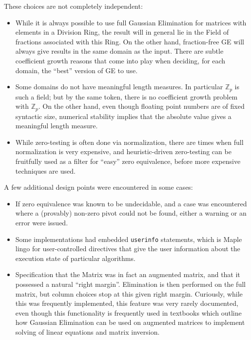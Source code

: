 \documentclass[11pt]{elsart}
\begin{document}
\noindent These choices are not completely independent:  
\begin{itemize}
	\item While it is always possible to use full Gaussian Elimination for
		matrices with elements in a Division Ring, the result will in general
		lie in the Field of fractions associated with this Ring.  On the other
		hand, fraction-free GE will always give results in the same domain as
		the input.  There are subtle coefficient growth reasons that come
		into play when deciding, for each domain, the ``best'' version of
		GE to use.
	\item Some domains do not have meaningful length measures.  In particular
		$\mathbb{Z}_p$ is such a field; but by the same token, there is
		no coefficient growth problem with $\mathbb{Z}_p$.  On the other
		hand, even though floating point numbers are of fixed syntactic
		size, numerical stability implies that the absolute value gives
		a meaningful length measure.
	\item While zero-testing is often done via normalization, there are
		times when full normalization is very expensive, and heuristic-driven
		zero-testing can be fruitfully used as a filter for ``easy''
		zero equivalence, before more expensive techniques are used.
\end{itemize}

\noindent A few additional design points were encountered in some cases:
\begin{itemize}
	\item If zero equivalence was known to be undecidable, and a case
		was encountered where a (provably) non-zero pivot could not be
		found, either a warning or an error were issued.
	\item Some implementations had embedded \texttt{userinfo}
		statements, which is Maple lingo for user-controlled directives 
		that give the user information about the execution state of 
		particular algorithms.
	\item Specification that the Matrix was in fact an augmented matrix,
		and that it possessed a natural ``right margin''.  Elimination
		is then performed on the full matrix, but column choices stop
		at this given right margin.  Curiously, while this was frequently
		implemented, this feature was very rarely documented, even though
		this functionality is frequently used in textbooks which 
		outline how Gaussian Elimination can be used on augmented matrices
		to implement solving of linear equations and matrix inversion.
\end{itemize}
\end{document}
